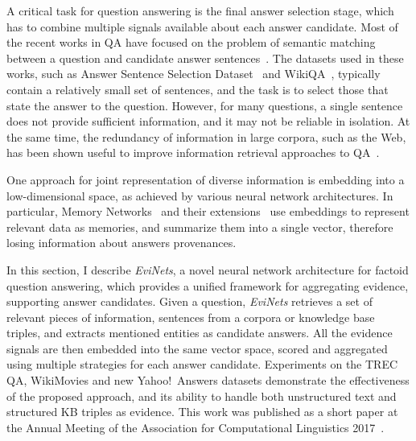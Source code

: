 A critical task for question answering is the final answer selection stage, which has to combine multiple signals available about each answer candidate.
Most of the recent works in QA have focused on the problem of semantic matching between a question and candidate answer sentences~\cite{he2016pairwise,rao2016noise,yang2016anmm}.
The datasets used in these works, such as Answer Sentence Selection Dataset~\cite{wang2007jeopardy} and WikiQA~\cite{yang2015wikiqa}, typically contain a relatively small set of sentences, and the task is to select those that state the answer to the question.
However, for many questions, a single sentence does not provide sufficient information, and it may not be reliable in isolation. At the same time,
the redundancy of information in large corpora, such as the Web, has been shown useful to improve information retrieval approaches to QA~\cite{clarke2001exploiting}.



One approach for joint representation of diverse information is embedding into a low-dimensional space, \ie as achieved by various neural network architectures.
In particular, Memory Networks~\cite{sukhbaatar2015end} and their extensions~\cite{miller2016key} use embeddings to represent relevant data as memories, and summarize them into a single vector, therefore losing information about answers provenances.

In this section, I describe \textit{EviNets}, a novel neural network architecture for factoid question answering, which provides a unified framework for aggregating evidence, supporting answer candidates.
Given a question, \textit{EviNets} retrieves a set of relevant pieces of information, \eg sentences from a corpora or knowledge base triples, and extracts mentioned entities as candidate answers.
All the evidence signals are then embedded into the same vector space, scored and aggregated using multiple strategies for each answer candidate.
Experiments on the TREC QA, WikiMovies and new Yahoo!~Answers datasets demonstrate the effectiveness of the proposed approach, and its ability to handle both unstructured text and structured KB triples as evidence.
This work was published as a short paper at the Annual Meeting of the
Association for Computational Linguistics 2017~\cite{savenkov_evinets17}.

